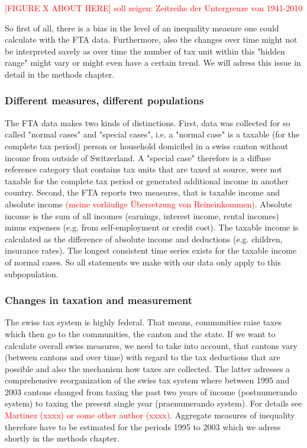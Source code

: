 \documentclass[twoside]{article}\usepackage[]{graphicx}\usepackage[]{color}
\begin{document}
\begin{multicols}{2}
\textcolor{red}{[FIGURE X ABOUT HERE] soll zeigen: Zeitreihe der Untergrenze von 1941-2010}

So first of all, there is a bias in the level of an inequality measure one could calculate with the   FTA data. Furthermore, also the changes over time might not be interpreted savely as over time the number of tax unit within this "hidden range" might vary or might even have a certain trend. We will adress this issue in detail in the methods chapter.

\subsubsection{Different measures, different populations}

The FTA data makes two kinds of distinctions. First, data was collected for so called "normal cases" and "special cases", i.e. a "normal case" is a taxable (for the complete tax period) person or household domiciled in a swiss canton without income from outside of Switzerland. A "special case" therefore is a diffuse reference category that contains tax units that are taxed at source, were not taxable for the complete tax period or generated additional income in another country. Second, the FTA reports two measures, that is taxable income and absolute income \textcolor{red}{(meine vorläufige Übersetzung von Reineinkommen)}. Absolute income is the sum of all incomes (earnings, interest income, rental incomes) minus expenses (e.g. from self-employment or credit cost). The taxable income is calculated as the difference of absolute income and deductions (e.g. children, insurance rates). The longest consistent time series exists for the taxable income of normal cases. So all statements we make with our data only apply to this subpopulation.

\subsubsection{Changes in taxation and measurement}
The swiss tax system is highly federal. That means, communities raise taxes which then go to the communities, the canton and the state. If we want to calculate overall swiss measures, we need to take into account, that cantons vary (between cantons and over time) with regard to the tax deductions that are possible and also the mechanism how taxes are collected. The latter adresses a comprehensive reorganization of the swiss tax system where between 1995 and 2003 cantons changed from taxing the past two years of income (postnumerando system) to taxing the present single year (praenumerando system). For details see \textcolor{red}{Martinez (xxxx) or some other author (xxxx)}. Aggregate measures of inequality therefore have to be estimated for the periods 1995 to 2003 which we adress shortly in the methods chapter.


\end{multicols}
\end{document}

